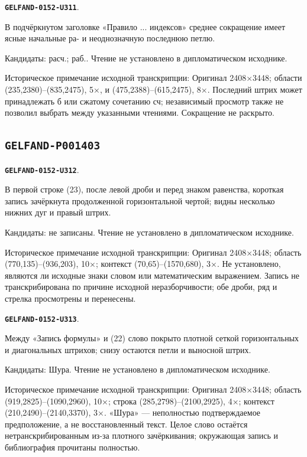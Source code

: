 \documentclass[11pt]{article}
\theoremstyle{definition}
\theoremstyle{remark}
\begin{document}
\par\noindent\leavevmode{}\label{GELFAND-0152-U311}\label{GELFAND-P001402:rule-abbreviation:note}\textbf{\texttt{GELFAND-0152-U311}}.\nopagebreak[4]\par
В подчёркнутом заголовке «Правило ... индексов» среднее сокращение имеет ясные начальные ра- и неоднозначную последнюю петлю.\par
Кандидаты: расч.; раб.. Чтение не установлено в дипломатическом исходнике.\par
Историческое примечание исходной транскрипции: Оригинал 2408×3448; области (235,2380)–(835,2475), 5×, и (475,2388)–(615,2475), 8×. Последний штрих может принадлежать б или сжатому сочетанию сч; независимый просмотр также не позволил выбрать между указанными чтениями. Сокращение не раскрыто.\par\medskip
\subsection*{\texttt{GELFAND-P001403}}
\par\noindent\leavevmode{}\label{GELFAND-0152-U312}\label{GELFAND-P001403:generating-cancelled:note}\textbf{\texttt{GELFAND-0152-U312}}.\nopagebreak[4]\par
В первой строке (23), после левой дроби и перед знаком равенства, короткая запись зачёркнута продолженной горизонтальной чертой; видны несколько нижних дуг и правый штрих. \par
Кандидаты: не записаны. Чтение не установлено в дипломатическом исходнике.\par
Историческое примечание исходной транскрипции: Оригинал 2408×3448; область (770,135)–(936,203), 10×; контекст (70,65)–(1570,680), 3×. Не установлено, являются ли исходные знаки словом или математическим выражением. Запись не транскрибирована по причине исходной неразборчивости; обе дроби, ряд и стрелка просмотрены и перенесены.\par\medskip
\par\noindent\leavevmode{}\label{GELFAND-0152-U313}\label{GELFAND-P001403:bottom-cancelled-word:note}\textbf{\texttt{GELFAND-0152-U313}}.\nopagebreak[4]\par
Между «Запись формулы» и (22) слово покрыто плотной сеткой горизонтальных и диагональных штрихов; снизу остаются петли и выносной штрих.\par
Кандидаты: Шура. Чтение не установлено в дипломатическом исходнике.\par
Историческое примечание исходной транскрипции: Оригинал 2408×3448; область (919,2825)–(1090,2960), 10×; строка (285,2798)–(2100,2925), 4×; контекст (210,2490)–(2140,3370), 3×. «Шура» — неполностью подтверждаемое предположение, а не восстановленный текст. Целое слово остаётся нетранскрибированным из-за плотного зачёркивания; окружающая запись и библиография прочитаны полностью.\par\medskip
\end{document}
